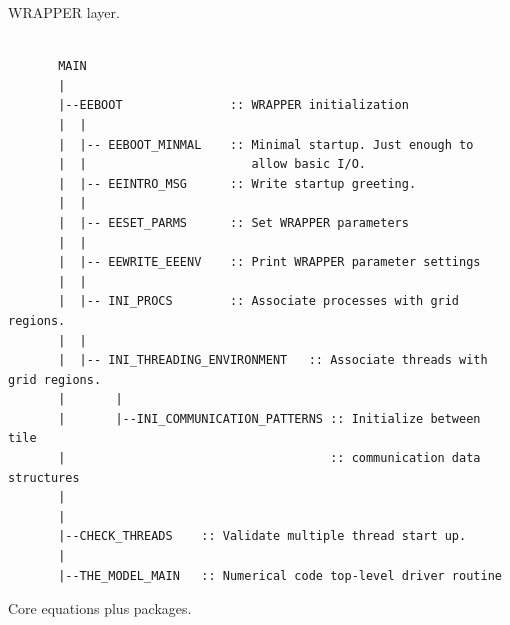 WRAPPER layer.

{\footnotesize
\begin{verbatim}

       MAIN  
       |
       |--EEBOOT               :: WRAPPER initialization
       |  |
       |  |-- EEBOOT_MINMAL    :: Minimal startup. Just enough to
       |  |                       allow basic I/O.
       |  |-- EEINTRO_MSG      :: Write startup greeting.
       |  |
       |  |-- EESET_PARMS      :: Set WRAPPER parameters
       |  |
       |  |-- EEWRITE_EEENV    :: Print WRAPPER parameter settings
       |  |
       |  |-- INI_PROCS        :: Associate processes with grid regions.
       |  |
       |  |-- INI_THREADING_ENVIRONMENT   :: Associate threads with grid regions.
       |       |
       |       |--INI_COMMUNICATION_PATTERNS :: Initialize between tile 
       |                                     :: communication data structures
       |
       |
       |--CHECK_THREADS    :: Validate multiple thread start up.
       |
       |--THE_MODEL_MAIN   :: Numerical code top-level driver routine

\end{verbatim}
}

Core equations plus packages.

